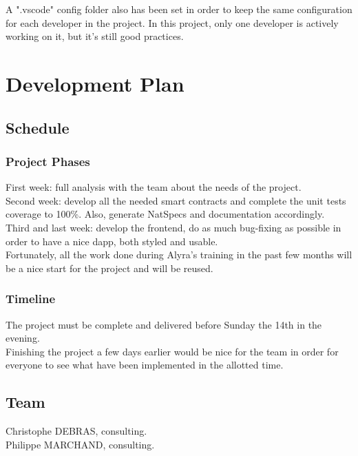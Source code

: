 \documentclass[a4paper, 12pt]{article}
\begin{document}
A ".vscode" config folder also has been set in order to keep the same configuration for each developer in the project. In this project, only one developer is actively working on it, but it's still good practices.

\section{Development Plan}

\subsection{Schedule}
\subsubsection{Project Phases}

First week: full analysis with the team about the needs of the project.\\

Second week: develop all the needed smart contracts and complete the unit tests coverage to 100\%. Also, generate NatSpecs and documentation accordingly.\\

Third and last week: develop the frontend, do as much bug-fixing as possible in order to have a nice dapp, both styled and usable.\\

Fortunately, all the work done during Alyra's training in the past few months will be a nice start for the project and will be reused.

\subsubsection{Timeline}

The project must be complete and delivered before Sunday the 14th in the evening.\\

Finishing the project a few days earlier would be nice for the team in order for everyone to see what have been implemented in the allotted time.

\subsection{Team}

Christophe DEBRAS, consulting.\\

Philippe MARCHAND, consulting.\\
\end{document}
